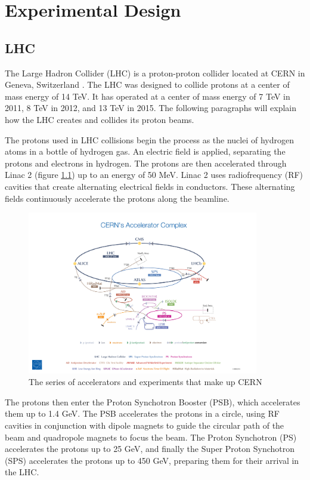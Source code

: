 \documentclass[oneside, letterpaper, oldfontcommands]{memoir}
\begin{document}
\chapter{Experimental Design}\label{experiment}

\section{LHC}\label{lhc}

\qquad The Large Hadron Collider (LHC) is a proton-proton collider located at CERN in Geneva, Switzerland \cite{1748-0221-3-08-S08001}. The LHC was designed to collide protons at a center of mass energy of 14 TeV. It has operated at a center of mass energy of 7 TeV in 2011, 8 TeV in 2012, and 13 TeV in 2015. The following paragraphs will explain how the LHC creates and collides its proton beams.

\qquad The protons used in LHC collisions begin the process as the nuclei of hydrogen atoms in a bottle of hydrogen gas. An electric field is applied, separating the protons and electrons in hydrogen. The protons are then accelerated through Linac 2 (figure \ref{fig:cernacc}) up to an energy of 50 MeV. Linac 2 uses radiofrequency (RF) cavities that create alternating electrical fields in conductors. These alternating fields continuously accelerate the protons along the beamline.

\begin{figure}[here]
\includegraphics[width=0.9\textwidth]{CERN's-accelerator-complex2013.jpg}
\caption{The series of accelerators and experiments that make up CERN \cite{Marcastel:1621583}}
\label{fig:cernacc}
\end{figure}

\qquad The protons then enter the Proton Synchotron Booster (PSB), which accelerates them up to 1.4 GeV. The PSB accelerates the protons in a circle, using RF cavities in conjunction with dipole magnets to guide the circular path of the beam and quadropole magnets to focus the beam. The Proton Synchotron (PS) accelerates the protons up to 25 GeV, and finally the Super Proton Synchotron (SPS) accelerates the protons up to 450 GeV, preparing them for their arrival in the LHC.
\end{document}
